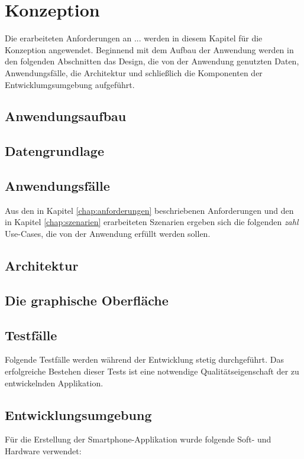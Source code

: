 \chapter{\label{chap:konzeption}Konzeption}
Die erarbeiteten Anforderungen an ... werden in diesem Kapitel für die Konzeption angewendet.
Beginnend mit dem Aufbau der Anwendung werden in den folgenden Abschnitten das Design, die von der Anwendung genutzten Daten, Anwendungsfälle,
die Architektur und schließlich die Komponenten der Entwicklumgsumgebung aufgeführt.
\section{Anwendungsaufbau}
\section{Datengrundlage}

\section{Anwendungsfälle}
Aus den in Kapitel \ref{chap:anforderungen} beschriebenen Anforderungen und den in Kapitel \ref{chap:szenarien} erarbeiteten Szenarien ergeben sich die folgenden \textit{zahl} Use-Cases, die von der Anwendung erfüllt werden sollen.

\section{Architektur}
\section{Die graphische Oberfläche}

\section{Testfälle}
Folgende Testfälle werden während der Entwicklung stetig durchgeführt. Das erfolgreiche Bestehen dieser Tests ist eine notwendige Qualitätseigenschaft der zu entwickelnden Applikation.


%
%
\section{Entwicklungsumgebung}
Für die Erstellung der Smartphone-Applikation wurde folgende Soft- und Hardware verwendet:
